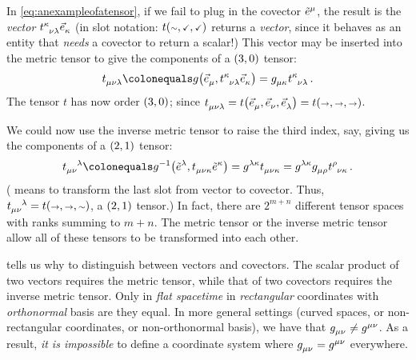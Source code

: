 In \cref{eq:anexampleofatensor}, if we fail to plug in the covector $\tbcov\mu$, the result is the \emph{vector} $\tensor{t}{^\kappa_\nu_\lambda}\tbvec\kappa$ (in slot notation: $t\vat{\cslot,\fslot,\fslot}$ returns a \emph{vector}, since it behaves as an entity that \emph{needs} a covector to return a scalar!) This vector may be inserted into the metric tensor to give the components of a $\torder 30$ tensor:
%
\begin{equation}\label{eq:exampleofmetrictransformationofatensor}
  \tensor{t}{_\mu_\nu_\lambda} \defas \metric\vat{\tbvec\mu, \tensor{t}{^\kappa_\nu_\lambda}\tbvec\kappa}
                               = \tmetric\mu\kappa\tensor{t}{^\kappa_\nu_\lambda}\,.
\end{equation}
%
The tensor $t$ has now order $\torder 30$; since $\tensor{t}{_\mu_\nu_\lambda} = t\vat{\tbvec\mu,\tbvec\nu,\tbvec\lambda} = t\vat{\vslot,\vslot,\vslot}$.

We could now use the inverse metric tensor to raise the third index, say, giving us the components of a $\torder 21$ tensor:
%
\begin{equation}\label{eq:exampleofinversemetrictransformationofatensor}
  \tensor{t}{_\mu_\nu^\lambda} \defas \invmet\vat{\tbcov\lambda,\tensor{t}{_\mu_\nu_\kappa}\tbcov\kappa}
                               = \tinvmet\lambda\kappa\tensor{t}{_\mu_\nu_\kappa}
                               = \tinvmet\lambda\kappa\tmetric\mu\rho\tensor{t}{^\rho_\nu_\kappa}\,.
\end{equation}
%
( means to transform the last slot from vector to covector. Thus, $\tensor{t}{_\mu_\nu^\lambda} = t\vat{\vslot,\vslot,\cslot}$, a $\torder 21$ tensor.)
%
In fact, there are $2^{m + n}$ different tensor spaces with ranks summing to $m + n$. The metric tensor or the inverse metric tensor allow all of these tensors to be transformed into each other.

  tells us why to distinguish between vectors and covectors. The scalar product of two vectors requires the metric tensor, while that of two covectors requires the inverse metric tensor. Only in \emph{flat spacetime} in \emph{rectangular} coordinates with \emph{orthonormal} basis are they equal. In more general settings (curved spaces, or non-rectangular coordinates, or non-orthonormal basis), we have that $\tmetric\mu\nu\neq\tinvmet\mu\nu$. As a result, \emph{it is impossible} to define a coordinate system where $\tmetric\mu\nu = \tinvmet\mu\nu$ everywhere.


